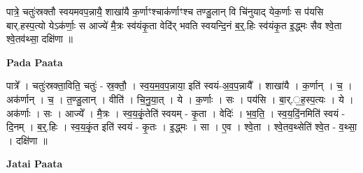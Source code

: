 \documentclass[17pt]{extarticle}
\begin{document}
पात्रे॒ चतुः॑स्रक्तौ स्वयमवप॒न्नायै॒ शाखा॑यै क॒र्णाꣳश्चाक॑र्णाꣳश्च तण्डु॒लान् वि चि॑नुयाद् येक॒र्णाः स प॑यसि बार्.हस्प॒त्यो येऽक॑र्णाः॒ स आज्ये॑ मै॒त्रः स्व॑यंकृ॒ता वेदि॑र् भवति स्वयन्दि॒॒नं ब॒र्॒.हिः स्व॑यंकृ॒त इ॒द्ध्मः सैव श्वे॒ता श्वे॒तव॑थ्सा॒ दक्षि॑णा ॥ \newline

\textbf{Pada Paata} \newline

पात्रे᳚ । चतुः॑स्रक्ता॒विति॒ चतुः॑ - स्र॒क्तौ॒ । स्व॒य॒म॒व॒प॒न्नाया॒ इति॑ स्वयं-अ॒व॒प॒न्नायै᳚ । शाखा॑यै । क॒र्णान् । च॒ । अक॑र्णान् । च॒ । त॒ण्डु॒लान् । वीति॑ । चि॒नु॒या॒त् । ये । क॒र्णाः । सः । पय॑सि । बा॒र्.॒ह॒स्प॒त्यः । ये । अक॑र्णाः । सः । आज्ये᳚ । मै॒त्रः । स्व॒य॒कृं॒तेति॑ स्वयम् - कृ॒ता । वेदिः॑ । भ॒व॒ति॒ । स्व॒य॒दिं॒नमिति॑ स्वयं - दि॒नम् । ब॒र्॒.हिः । स्व॒य॒कृं॒त इति॑ स्वयं - कृ॒तः । इ॒द्ध्मः । सा । ए॒व । श्वे॒ता । श्वे॒तव॒थ्सेति॑ श्वे॒त - व॒थ्सा॒ । दक्षि॑णा ॥  \newline



\textbf{Jatai Paata} \newline
\end{document}
